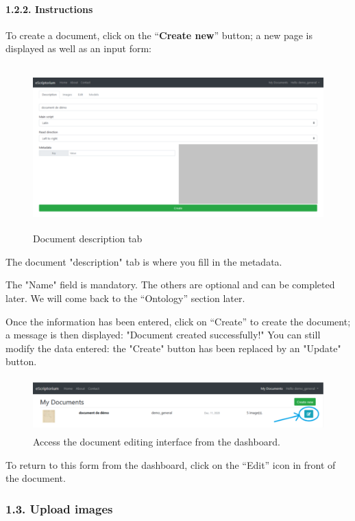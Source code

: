 \documentclass[
]{book}
\begin{document}
\hypertarget{instructions}{%
\paragraph{1.2.2. Instructions}\label{instructions}}

To create a document, click on the ``\textbf{Create new}'' button; a new page
is displayed as well as an input form:

\begin{figure}
\centering
\includegraphics[width=5.20833in,height=2.48611in]{img/eScrTut/image3.png}
\caption{Document description tab}
\end{figure}

The document "description" tab is where you fill in the metadata.

The "Name" field is mandatory. The others are optional and can be
completed later. We will come back to the ``Ontology'' section later.

Once the information has been entered, click on ``Create'' to create the
document; a message is then displayed: "Document created successfully!"
You can still modify the data entered: the "Create" button has been
replaced by an "Update" button.

\begin{figure}
\centering
\includegraphics[width=5.20833in,height=0.81944in]{img/eScrTut/image4.png}
\caption{Access the document editing interface from the dashboard.}
\end{figure}

To return to this form from the dashboard, click on the ``Edit'' icon in
front of the document.

\hypertarget{upload-images}{%
\subsubsection{1.3. Upload images}\label{upload-images}}
\end{document}

